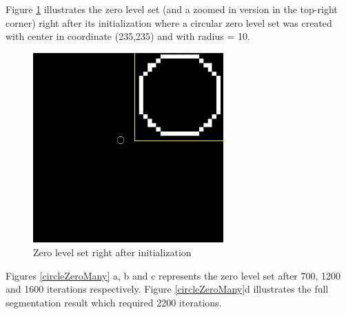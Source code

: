 Figure \ref{circleZero0} illustrates the zero level set (and a zoomed in version in the top-right corner) right after its initialization where a circular zero level set was created with center in coordinate (235,235) and with radius = 10. 
\begin{figure}[h!]
\centering
\includegraphics[width=0.65\textwidth]{results/2D/circleZero0}
\caption{Zero level set right after initialization}
\label{circleZero0}
\end{figure} 

Figures \ref{circleZeroMany} a, b and c represents the zero level set after 700, 1200 and 1600 iterations respectively. Figure \ref{circleZeroMany}d illustrates the full segmentation result which required 2200 iterations.

